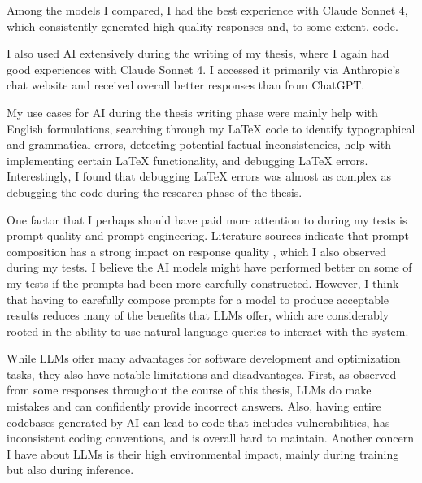 \vspace{\baselineskip}
Among the models I compared, I had the best experience with Claude Sonnet 4, which consistently generated high-quality responses and, to some extent, code.

I also used AI extensively during the writing of my thesis, where I again had good experiences with Claude Sonnet 4.
I accessed it primarily via Anthropic's chat website \cite{claude-online} and received overall better responses than from ChatGPT.

My use cases for AI during the thesis writing phase were mainly help with English formulations,
searching through my LaTeX code to identify typographical and grammatical errors,
detecting potential factual inconsistencies,
help with implementing certain LaTeX functionality,
and debugging LaTeX errors.
Interestingly, I found that debugging LaTeX errors was almost as complex as debugging the code during the research phase of the thesis.

\vspace{\baselineskip}
One factor that I perhaps should have paid more attention to during my tests is prompt quality and prompt engineering.
Literature sources indicate that prompt composition has a strong impact on response quality \cite{prompt-quality}, which I also observed during my tests.
I believe the AI models might have performed better on some of my tests if the prompts had been more carefully constructed.
However, I think that having to carefully compose prompts for a model to produce acceptable results reduces many of the benefits that LLMs offer,
which are considerably rooted in the ability to use natural language queries to interact with the system.

\vspace{\baselineskip}
While LLMs offer many advantages for software development and optimization tasks, they also have notable limitations and disadvantages.
First, as observed from some responses throughout the course of this thesis, LLMs do make mistakes and can confidently provide incorrect answers.
Also, having entire codebases generated by AI can lead to code that includes vulnerabilities, has inconsistent coding conventions, and is overall hard to maintain.
Another concern I have about LLMs is their high environmental impact, mainly during training but also during inference.

